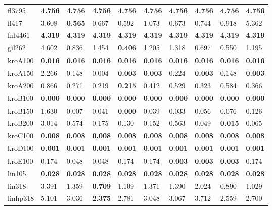 \begin{tabular}{llllllllll}
fl3795 & \textbf{4.756} & \textbf{4.756} & \textbf{4.756} & \textbf{4.756} & \textbf{4.756} & \textbf{4.756} & \textbf{4.756} & \textbf{4.756} & \textbf{4.756} \\
fl417 & 3.608 & \textbf{0.565} & 0.667 & 0.592 & 1.073 & 0.673 & 0.744 & 0.918 & 5.362 \\
fnl4461 & \textbf{4.319} & \textbf{4.319} & \textbf{4.319} & \textbf{4.319} & \textbf{4.319} & \textbf{4.319} & \textbf{4.319} & \textbf{4.319} & \textbf{4.319} \\
gil262 & 4.602 & 0.836 & 1.454 & \textbf{0.406} & 1.205 & 1.318 & 0.697 & 0.550 & 1.195 \\
kroA100 & \textbf{0.016} & \textbf{0.016} & \textbf{0.016} & \textbf{0.016} & \textbf{0.016} & \textbf{0.016} & \textbf{0.016} & \textbf{0.016} & \textbf{0.016} \\
kroA150 & 2.266 & 0.148 & 0.004 & \textbf{0.003} & \textbf{0.003} & 0.224 & \textbf{0.003} & 0.148 & \textbf{0.003} \\
kroA200 & 0.866 & 0.271 & 0.219 & \textbf{0.215} & 0.412 & 0.529 & 0.323 & 0.584 & 0.366 \\
kroB100 & \textbf{0.000} & \textbf{0.000} & \textbf{0.000} & \textbf{0.000} & \textbf{0.000} & \textbf{0.000} & \textbf{0.000} & \textbf{0.000} & \textbf{0.000} \\
kroB150 & 1.630 & 0.007 & 0.041 & \textbf{0.000} & 0.039 & 0.033 & 0.056 & 0.076 & 0.126 \\
kroB200 & 3.014 & 0.574 & 0.175 & 0.130 & 0.152 & 0.563 & 0.049 & \textbf{0.015} & 0.065 \\
kroC100 & \textbf{0.008} & \textbf{0.008} & \textbf{0.008} & \textbf{0.008} & \textbf{0.008} & \textbf{0.008} & \textbf{0.008} & \textbf{0.008} & \textbf{0.008} \\
kroD100 & \textbf{0.001} & \textbf{0.001} & \textbf{0.001} & \textbf{0.001} & \textbf{0.001} & \textbf{0.001} & \textbf{0.001} & \textbf{0.001} & \textbf{0.001} \\
kroE100 & 0.174 & 0.048 & 0.048 & 0.174 & 0.174 & \textbf{0.003} & \textbf{0.003} & \textbf{0.003} & 0.174 \\
lin105 & \textbf{0.028} & \textbf{0.028} & \textbf{0.028} & \textbf{0.028} & \textbf{0.028} & \textbf{0.028} & \textbf{0.028} & \textbf{0.028} & \textbf{0.028} \\
lin318 & 3.391 & 1.359 & \textbf{0.709} & 1.109 & 1.371 & 1.390 & 2.024 & 0.890 & 1.029 \\
linhp318 & 5.101 & 3.036 & \textbf{2.375} & 2.781 & 3.048 & 3.067 & 3.712 & 2.559 & 2.700 \\

\end{tabular}
